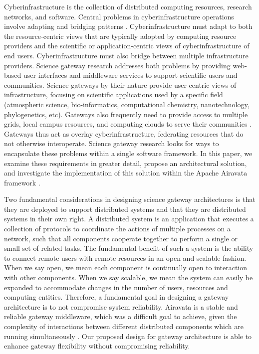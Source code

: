 \documentclass[review]{elsarticle}
\begin{document}
Cyberinfrastructure is the collection of distributed computing resources, research networks, and software. Central problems in cyberinfrastructure operations involve adapting and bridging patterns \cite{hey2005cyberinfrastructure}. Cyberinfrastructure must adapt to both the resource-centric views that are typically adopted by computing resource providers and the scientific or application-centric views of cyberinfrastructure of end users. Cyberinfrastructure must also bridge between multiple infrastructure providers. Science gateway research addresses both problems by providing web-based user interfaces and middleware services to support scientific users and communities. Science gateways by their nature provide user-centric views of infrastructure, focusing on scientific applications used by a specific field (atmospheric science, bio-informatics, computational chemistry, nanotechnology, phylogenetics, etc). Gateways also frequently need to provide access to multiple grids, local campus resources, and computing clouds to serve their communities \cite{perera2008workflow}. Gateways thus act as overlay cyberinfrastructure, federating resources that do not otherwise interoperate. Science gateway research looks for ways to encapsulate these problems within a single software framework. In this paper, we examine these requirements in greater detail, propose an architectural solution, and investigate the implementation of this solution within the Apache Airavata framework \cite{marru2011apache,marru2015apache}. 

Two fundamental considerations in designing science gateway architectures is that they are deployed to support distributed systems and that they are distributed systems in their own right.   A distributed system is an application that executes a collection of protocols to coordinate the actions of multiple processes on a network, such that all components cooperate together to perform a single or small set of related tasks. The fundamental benefit of such a system is the ability to connect remote users with remote resources in an open and scalable fashion. When we say open, we mean each component is continually open to interaction with other components. When we say scalable, we mean the system can easily be expanded to accommodate changes in the number of users, resources and computing entities.  Therefore, a fundamental goal in designing a gateway architecture is to not compromise system reliability.  Airavata is a stable and reliable gateway middleware, which was a difficult goal to achieve, given the complexity of interactions between different distributed components which are running simultaneously \cite{pierce2015apache}. Our proposed design for gateway architecture is able to enhance gateway flexibility without compromising reliability.
\end{document}
